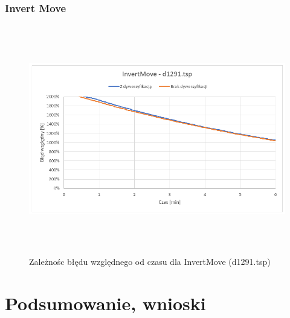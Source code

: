 \documentclass[a4paper,11pt]{article}
\begin{document}
\subsubsection{Invert Move}
\begin{figure}[H]
\centering
\includegraphics[height=10cm]{InvertMove1291.PNG}
\caption{Zależnośc błędu względnego od czasu dla InvertMove (d1291.tsp)}
\end{figure}

\section{Podsumowanie, wnioski}
\end{document}
